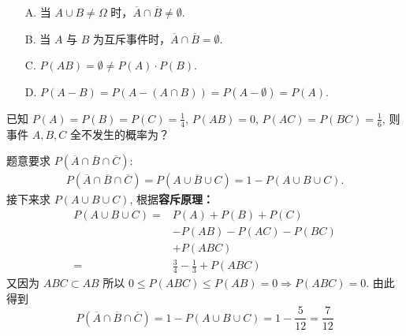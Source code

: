 \documentclass[12pt, a4paper, oneside, UTF8]{ctexbook}
\begin{document}
\begin{solution}
    \begin{enumerate}
        \item[A.] 当 \(A \cup B \neq \Omega\) 时，\(\overline{A} \cap \overline{B} \neq \emptyset\).
        \item[B.] 当 \(A\) 与 \(B\) 为互斥事件时，\(\overline{A} \cap \overline{B} = \emptyset\). 
        \item[C.] \(P\left(AB\right) = \emptyset \neq P\left(A\right) \cdot P\left(B\right)\).
        \item[D.] \(P\left(A - B\right) = P\left(A - \left(A \cap B\right)\right) = P\left(A - \emptyset\right) = P\left(A\right)\).
    \end{enumerate}
\end{solution}

\begin{example}
    已知 \(P\left(A\right) = P\left(B\right) = P\left(C\right) = \frac{1}{4}\), \(P\left(AB\right) = 0\), \(P\left(AC\right) = P\left(BC\right) = \frac{1}{6}\), 则事件 \(A , B , C\) 全不发生的概率为？
\end{example}

\begin{solution}
    题意要求 \(P\left(\overline{A} \cap \overline{B} \cap \overline{C}\right)\):
    \begin{align*}
        P\left(\overline{A} \cap \overline{B} \cap \overline{C}\right) = P\left(\overline{A \cup B \cup C}\right) = 1 - P\left(A \cup B \cup C\right).
    \end{align*}
    接下来求 \(P\left(A \cup B \cup C\right)\), 根据\textbf{容斥原理：}
    \begin{align*}
        P\left(A \cup B \cup C\right) =& P\left(A\right) + P\left(B\right) + P\left(C\right) \\
        & -P\left(AB\right) - P\left(AC\right) - P\left(BC\right) \\
        & + P\left(ABC\right)\\
        =& \frac{3}{4} - \frac{1}{3} + P\left(ABC\right)
    \end{align*}
    又因为 \(ABC \subset AB\) 所以 \(0 \leqslant P\left(ABC\right) \leqslant P\left(AB\right) = 0 \Rightarrow P\left(ABC\right) = 0\). 由此得到
    \[P\left(\overline{A} \cap \overline{B} \cap \overline{C}\right) = 1 - P\left(A \cup B \cup C\right) = 1 - \frac{5}{12} = \frac{7}{12}\]
\end{solution}
\end{document}
